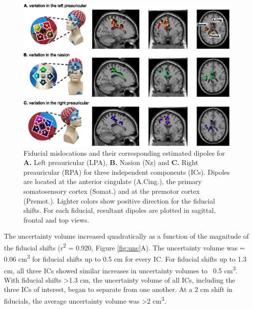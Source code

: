 \documentclass{UCF_ETD}
\newcommand{\tss}[1]{\textsuperscript{#1}}
\begin{document}
\begin{figure}[t!]
      \centering
      \includegraphics[width=\linewidth]{img/fig1.eps}
      \caption{Fiducial mislocations and their corresponding estimated dipoles for \textbf{A.} Left preauricular (LPA), \textbf{B.} Nasion (Nz) and \textbf{C.} Right preauricular (RPA) for three independent components (ICs). Dipoles are located at the anterior cingulate (A.Cing.), the primary somatosensory cortex (Somat.) and at the premotor cortex (Premot.). Lighter colors show positive direction for the fiducial shifts. For each fiducial, resultant dipoles are plotted in sagittal, frontal and top views.}
      \label{fig:sl}
\end{figure}

The uncertainty volume increased quadratically as a function of the magnitude of the fiducial shifts (r\tss{2} = 0.920, Figure \ref{fig:unc}A). The uncertainty volume was $\thicksim$0.06 cm\tss{3} for fiducial shifts up to 0.5 cm for every IC. For fiducial shifts up to 1.3 cm, all three ICs showed similar increases in uncertainty volumes to ~0.5 cm\tss{3}. With fiducial shifts >1.3 cm, the uncertainty volume of all ICs, including the three ICs of interest, began to separate from one another. At a 2 cm shift in fiducials, the average uncertainty volume was >2 cm\tss{3}.
\end{document}
